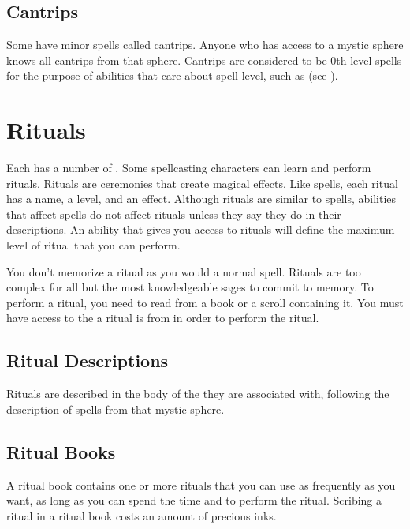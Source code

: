     \subsection{Cantrips}\label{Cantrips}
        Some  have minor spells called cantrips.
        Anyone who has access to a mystic sphere knows all cantrips from that sphere.
        Cantrips are considered to be 0th level spells for the purpose of abilities that care about spell level, such as  (see ).

\section{Rituals}\label{Rituals}
    Each  has a number of .
    Some spellcasting characters can learn and perform rituals.
    Rituals are ceremonies that create magical effects.
    Like spells, each ritual has a name, a level, and an effect.
    Although rituals are similar to spells, abilities that affect spells do not affect rituals unless they say they do in their descriptions.
    An ability that gives you access to rituals will define the maximum level of ritual that you can perform.

    You don't memorize a ritual as you would a normal spell.
    Rituals are too complex for all but the most knowledgeable sages to commit to memory.
    To perform a ritual, you need to read from a book or a scroll containing it.
    You must have access to the  a ritual is from in order to perform the ritual.

    \subsection{Ritual Descriptions}
        Rituals are described in the body of the  they are associated with, following the description of spells from that mystic sphere.

    \subsection{Ritual Books}
        A ritual book contains one or more rituals that you can use as frequently as you want, as long as you can spend the time and  to perform the ritual.
        Scribing a ritual in a ritual book costs an amount of precious inks.

